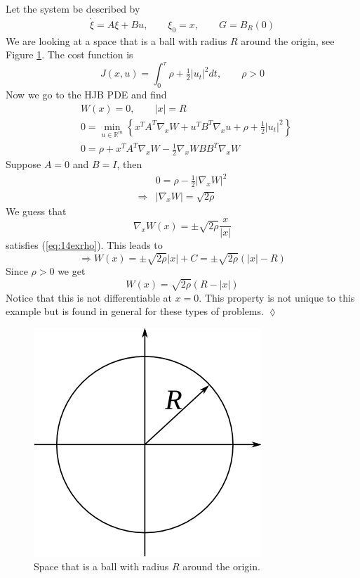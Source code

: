 \begin{example}
\label{ex:14exit}
Let the system be described by
\begin{align*}
\dot{\xi} = A\xi+Bu, \qquad \xi_0 = x, \qquad G=B_R(0)
\end{align*}
We are looking at a space that is a ball with radius $R$ around the origin, see Figure \ref{fig:14circle}. The cost function is
$$J(x,u) = \int_0^\tau \rho + \tfrac{1}{2}|u_t|^2dt, \qquad \rho>0$$
Now we go to the HJB PDE and find
\begin{align*}
&W(x) = 0, \qquad |x|=R \\
&0 = \min_{u\in\mathbb{R}^m} \left\lbrace x^TA^T\nabla_xW + u^TB^T\nabla_xu + \rho + \tfrac{1}{2}|u_t|^2 \right\rbrace \\
&0 = \rho + x^TA^T\nabla_xW - \tfrac{1}{2}\nabla_xWBB^T\nabla_xW
\end{align*}
Suppose $A=0$ and $B=I$, then
\begin{align}
\label{eq:14exrho}
&0 = \rho - \tfrac{1}{2}|\nabla_xW|^2 \nonumber \\
\Rightarrow &|\nabla_xW| = \sqrt{2\rho}
\end{align}
We guess that
$$\nabla_xW(x) = \pm \sqrt{2\rho}\frac{x}{|x|}$$
satisfies (\ref{eq:14exrho}). This leads to
$$\Rightarrow W(x) = \pm\sqrt{2\rho}|x|+C = \pm\sqrt{2\rho}(|x|-R)$$
Since $\rho>0$ we get
$$W(x) = \sqrt{2\rho}(R-|x|)$$
Notice that this is not differentiable at $x=0$. This property is not unique to this example but is found in general for these types of problems.
$\lozenge$
\end{example}

\begin{figure}[ht!]
	\centering
	\includegraphics[width=.4\textwidth]{images/14circle}
	\caption{Space that is a ball with radius $R$ around the origin.}
	\label{fig:14circle}
\end{figure}

